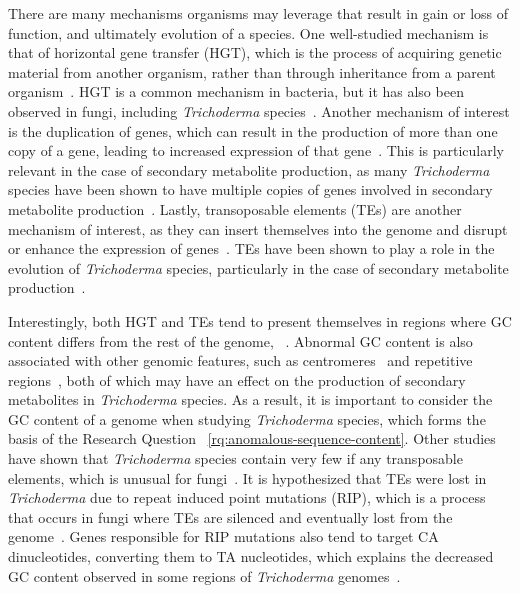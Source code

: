 There are many mechanisms organisms may leverage that result in gain or loss of function, and ultimately evolution of a species. One well-studied mechanism is that of horizontal gene transfer (HGT), which is the process of acquiring genetic material from another organism, rather than through inheritance from a parent organism~\cite{goncalves2024}. HGT is a common mechanism in bacteria, but it has also been observed in fungi, including \textit{Trichoderma} species~\cite{goncalves2024}. Another mechanism of interest is the duplication of genes, which can result in the production of more than one copy of a gene, leading to increased expression of that gene~\cite{goncalves2024}. This is particularly relevant in the case of secondary metabolite production, as many \textit{Trichoderma} species have been shown to have multiple copies of genes involved in secondary metabolite production~\cite{Mukherjee2012}. Lastly, transoposable elements (TEs) are another mechanism of interest, as they can insert themselves into the genome and disrupt or enhance the expression of genes~\cite{goncalves2024}. TEs have been shown to play a role in the evolution of \textit{Trichoderma} species, particularly in the case of secondary metabolite production~\cite{goncalves2024}. 

Interestingly, both HGT and TEs tend to present themselves in regions where GC content differs from the rest of the genome, ~\cite{goncalves2024}. Abnormal GC content is also associated with other genomic features, such as centromeres~\cite{plohl2014a} and repetitive regions~\cite{winter2018}, both of which may have an effect on the production of secondary metabolites in \textit{Trichoderma} species. As a result, it is important to consider the GC content of a genome when studying \textit{Trichoderma} species, which forms the basis of the Research Question ~\ref{rq:anomalous-sequence-content}. Other studies have shown that \textit{Trichoderma} species contain very few if any transposable elements, which is unusual for fungi~\cite{kubicek2011}. It is hypothesized that TEs were lost in \textit{Trichoderma} due to repeat induced point mutations (RIP), which is a process that occurs in fungi where TEs are silenced and eventually lost from the genome~\cite{kubicek2011}. Genes responsible for RIP mutations also tend to target CA dinucleotides, converting them to TA nucleotides, which  explains the decreased GC content observed in some regions of \textit{Trichoderma} genomes~\cite{goncalves2024}.

